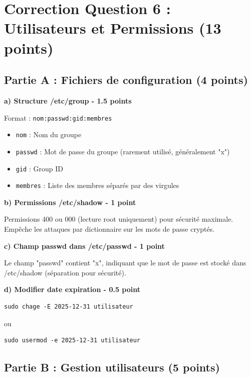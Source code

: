\documentclass[12pt,a4paper]{article}
\begin{document}

\section{Correction Question 6 : Utilisateurs et Permissions (13 points)}

\subsection*{Partie A : Fichiers de configuration (4 points)}

\begin{answerbox}
\textbf{a) Structure /etc/group - 1.5 points}

Format : \texttt{nom:passwd:gid:membres}

\begin{itemize}
    \item \texttt{nom} : Nom du groupe
    \item \texttt{passwd} : Mot de passe du groupe (rarement utilisé, généralement "x")
    \item \texttt{gid} : Group ID
    \item \texttt{membres} : Liste des membres séparés par des virgules
\end{itemize}

\textbf{b) Permissions /etc/shadow - 1 point}

Permissions 400 ou 000 (lecture root uniquement) pour sécurité maximale. Empêche les attaques par dictionnaire sur les mots de passe cryptés.

\textbf{c) Champ passwd dans /etc/passwd - 1 point}

Le champ "passwd" contient "x", indiquant que le mot de passe est stocké dans /etc/shadow (séparation pour sécurité).

\textbf{d) Modifier date expiration - 0.5 point}
\begin{lstlisting}
sudo chage -E 2025-12-31 utilisateur
\end{lstlisting}

ou

\begin{lstlisting}
sudo usermod -e 2025-12-31 utilisateur
\end{lstlisting}
\end{answerbox}

\subsection*{Partie B : Gestion utilisateurs (5 points)}
\end{document}
